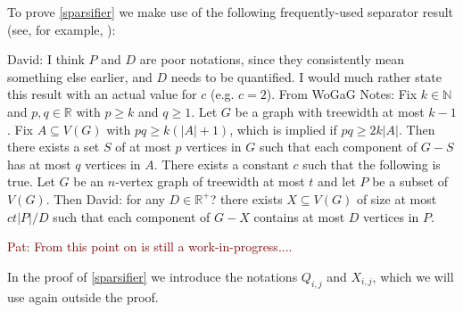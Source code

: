 \documentclass{patmorin}
\renewcommand{\geq}{\geqslant}
\newcommand{\david}[1]{{\color{orange} David: #1}}
\newcommand{\pat}[1]{\textcolor{Maroon}{Pat: #1}}
\begin{document}
To prove \cref{sparsifier} we make use of the following frequently-used separator result (see, for example, \cite[Lemma~11]{bose.dujmovic.ea:asymptotically}):


\begin{lem}\label{pq_separator}
\david{I think $P$ and $D$ are poor notations, since they consistently mean something else earlier, and $D$ needs to be quantified. I would much rather state this result with an actual value for $c$ (e.g. $c=2$). From WoGaG Notes:  Fix $k\in\mathbb{N}$ and $p,q\in\mathbb{R}$ with $p\geq k$ and $q\geq 1$. Let $G$ be a graph with treewidth at most $k-1$. Fix $A\subseteq V(G)$  with $pq\geq k(|A|+1)$, which is implied if $pq\geq 2k|A|$. Then there exists a set $S$ of at most $p$ vertices in $G$ such that each component of $G-S$ has at most $q$ vertices in $A$. }
  There exists a constant $c$ such that the following is true.
  Let $G$ be an $n$-vertex graph of treewidth at most $t$ and let $P$ be a subset of $V(G)$.  Then \david{for any $D\in\mathbb{R}^+$?} there exists $X\subseteq V(G)$ of size at most $ct|P|/D$ such that each component of $G-X$ contains at most $D$ vertices in $P$.
\end{lem}

\pat{From this point on is still a work-in-progress....}


In the proof of \cref{sparsifier} we introduce the notations $Q_{i,j}$ and $X_{i,j}$, which we will use again outside the proof.
\end{document}
